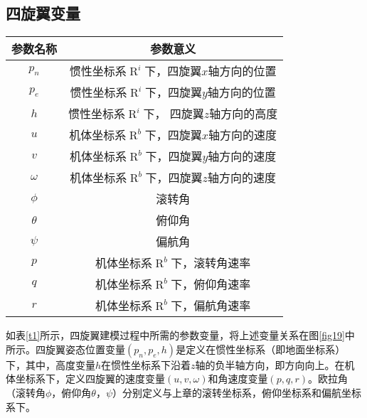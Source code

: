   \subsection{四旋翼变量}
\begin{table}[!h]
\begin{center}
\caption{四旋翼参数表}\label{t1}
\begin{longtable}{ | c| c|}
\hline
参数名称                                    & 参数意义                                                                  \\\hline
${p_n}$                    & 惯性坐标系$\mathop R\nolimits^i $下，四旋翼$x$轴方向的位置                               \\\hline
${p_e}$           & 惯性坐标系$\mathop R\nolimits^i $下，四旋翼$y$轴方向的位置                                    \\\hline
$h$              & 惯性坐标系$\mathop R\nolimits^i $下， 四旋翼$z$轴方向的高度                                            \\\hline
$u$                      & 机体坐标系$\mathop R\nolimits^b $下，四旋翼$x$轴方向的速度
                                          \\\hline
$v$                 & 机体坐标系$\mathop R\nolimits^b $下，四旋翼$y$轴方向的速度
                          \\\hline
$\omega $ &  机体坐标系$\mathop R\nolimits^b $下，四旋翼$z$轴方向的速度
 \\\hline
$\phi $             & 滚转角
\\\hline
$\theta $ &俯仰角
\\\hline
$\psi $  &  偏航角
\\\hline
$p$ &   机体坐标系$\mathop R\nolimits^b $下，滚转角速率
\\\hline
$q$ &  机体坐标系$\mathop R\nolimits^b $下，俯仰角速率
\\\hline
$r$ &    机体坐标系$\mathop R\nolimits^b $下，偏航角速率
\\\hline
\end{longtable}
\end{center}
\end{table}
\vspace{-20pt}
如表\ref{t1}所示，四旋翼建模过程中所需的参数变量，将上述变量关系在图\ref{fig19}中所示。四旋翼姿态位置变量$\left( {{p_n},{p_e},h} \right)$是定义在惯性坐标系（即地面坐标系）下，其中，高度变量$h$在惯性坐标系下沿着$z$轴的负半轴方向，即方向向上。在机体坐标系下，定义四旋翼的速度变量$\left( {u,v,\omega } \right)$和角速度变量$\left( {p,q,r} \right)$。欧拉角（滚转角$\phi $，俯仰角$\theta $，$\psi $）分别定义与上章的滚转坐标系，俯仰坐标系和偏航坐标系下。

